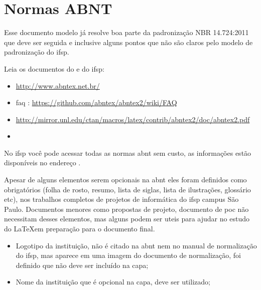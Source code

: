 \section{Normas ABNT}

Esse documento modelo já resolve boa parte da padronização NBR 14.724:2011 \cite{NBR14724:2011} que deve ser seguida e inclusive alguns pontos que não são claros pelo modelo de padronização do \ac{ifsp}.

Leia os documentos do \abnTeX e do \ac{ifsp}:
\begin{itemize}
    \item \url{http://www.abntex.net.br/}
    
    \item \acs{faq} : \url{https://github.com/abntex/abntex2/wiki/FAQ}
    
    \item \url{http://mirror.unl.edu/ctan/macros/latex/contrib/abntex2/doc/abntex2.pdf}
    
    \item {}
\end{itemize}

No \ac{ifsp} você pode acessar todas as normas \ac{abnt} sem custo, as informações estão disponíveis no endereço .

Apesar de alguns elementos serem opcionais na \ac{abnt} eles foram definidos como obrigatórios (folha de rosto, resumo, lista de siglas, lista de ilustrações, glossário etc), nos trabalhos completos de projetos de informática do \ac{ifsp} campus São Paulo. Documentos menores como propostas de projeto, documento de \ac{poc} não necessitam desses elementos, mas alguns podem ser uteis para ajudar no estudo do \LaTeX em preparação para o documento final.

\begin{itemize}
    \item Logotipo da instituição, não é citado na \ac{abnt} nem no manual de normalização do \ac{ifsp}, mas aparece em uma imagem do documento de normalização, foi definido que não deve ser incluído na capa;
    
    \item Nome da instituição que é opcional na capa, deve ser utilizado;
    
\end{itemize}

